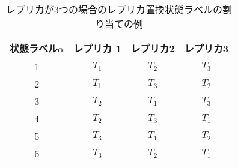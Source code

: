 \begin{table}
 \caption{レプリカが3つの場合のレプリカ置換状態ラベルの割り当ての例}
 \centering
 \begin{tabular}{c|c c c}
 状態ラベル$\alpha$ & レプリカ 1 & レプリカ2 & レプリカ3 \\
 \hline
 1 & $T_{1}$ & $T_{2}$ & $T_{3}$ \\
 2 & $T_{1}$ & $T_{3}$ & $T_{2}$ \\
 3 & $T_{2}$ & $T_{1}$ & $T_{3}$ \\
 4 & $T_{2}$ & $T_{3}$ & $T_{1}$ \\
 5 & $T_{3}$ & $T_{1}$ & $T_{2}$ \\
 6 & $T_{3}$ & $T_{2}$ & $T_{1}$ \\
 \end{tabular}
 \label{tbl:RPMalpha}
\end{table}

